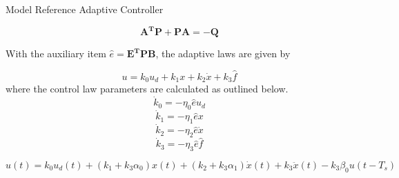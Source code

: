 \documentclass[10pt]{beamer}
\begin{document}
\begin{frame}{Model Reference Adaptive Controller}

  \begin{equation*}
    \label{eq:lyap}
    \mathbf{A^TP + PA = -Q}
  \end{equation*}

  With the auxiliary item $\hat{e} = \mathbf{E^TPB}$, the adaptive laws are given by

  \begin{equation*}
    \label{eq:adaplaws}
    u = k_0u_d + k_1x + k_2\dot{x} + k_3\hat{f}
  \end{equation*}
  where the control law parameters are calculated as outlined below.
  \begin{equation*}
    \label{eq:adaplaws1}
    \dot{k}_0 = -\eta_0\hat{e}u_d
  \end{equation*}
  \begin{equation*}
    \label{eq:adaplaws2}
    \dot{k}_1 = -\eta_1\hat{e}x
  \end{equation*}
  \begin{equation*}
    \label{eq:adaplaws3}
    \dot{k}_2 = -\eta_2\hat{e}\dot{x}
  \end{equation*}
  \begin{equation*}
    \label{eq:adaplaws4}
    \dot{k}_3 = -\eta_3\hat{e}\hat{f}
  \end{equation*}

  \begin{equation*}
      \label{eq:adaplawsfinal}
    u(t) = k_0u_d(t) + (k_1 + k_3\alpha_0)x(t) +  (k_2 + k_3\alpha_1)\dot{x}(t) + k_3\ddot{x}(t) - k_3\beta_0u(t-T_s)
  \end{equation*}
\end{frame}
\end{document}
